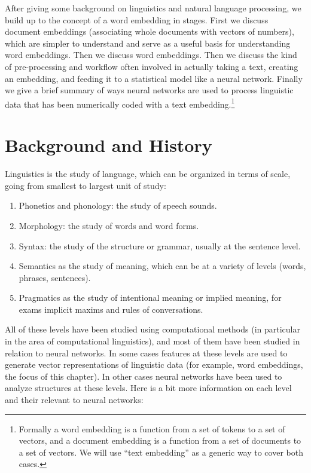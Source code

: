 After giving some background on linguistics and natural language processing, we build up to the concept of a word embedding in stages. First we discuss document embeddings (associating whole documents with vectors of numbers), which are simpler to understand and serve as a useful basis for understanding word embeddings. Then we discuss word embeddings. Then we discuss the kind of pre-processing and workflow often involved in actually taking a text, creating an embedding, and feeding it to a statistical model like a neural network. Finally we give a brief summary of ways neural networks are used to process linguistic data that has been numerically coded with a text embedding.\footnote{Formally a word embedding is a function from a set of tokens to a set of vectors, and a document embedding is a function from a set of documents to a set of vectors.  We will use ``text embedding'' as a generic way to cover both cases.}

\section{Background and History}

Linguistics is the study of language, which can be organized in terms of scale, going from smallest to largest unit of study: 
\begin{enumerate}
\item Phonetics and phonology: the study of speech sounds.
\item Morphology: the study of words and word forms.
\item Syntax: the study of the structure or grammar, usually at the sentence level.
\item Semantics as the study of meaning, which can be at a variety of levels (words, phrases, sentences).
\item Pragmatics as the study of intentional meaning or implied meaning, for exams implicit maxims and rules of conversations. 
\end{enumerate}


All of these levels have been studied using computational methods (in particular in the area of computational linguistics), and most of them have been studied in relation to neural networks. In some cases features at these levels are used to generate vector representations of linguistic data (for example, word embeddings, the focus of this chapter). In other cases neural networks have been used to analyze structures at these levels. Here is a bit more information on each level and their relevant to neural networks:

